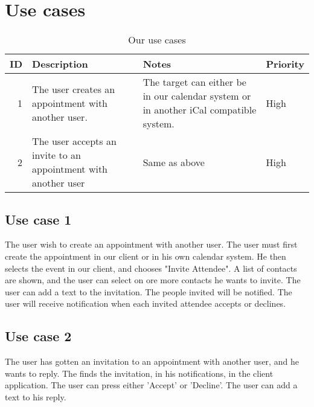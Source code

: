 \section{Use cases}
\begin{table*}[ht]\centering
  \begin{tabularx}{\textwidth}{@{}rXXl@{}}\toprule
    \textbf{ID} & \textbf{Description} & \textbf{Notes} & \textbf{Priority} \\\hline
    1 & The user creates an appointment with another user.             & The
    target can either be in our calendar system or in another iCal compatible
    system. & High \\\hline
    2 & The user accepts an invite to an appointment with another user & Same
    as above
    & High \\
    \bottomrule
  \end{tabularx}
  \caption{Our use cases}
  \label{usecases}\centering%
\end{table*}
\subsection{Use case 1}
The user wish to create an appointment with another user. The user must first create the appointment in our client or in his own calendar system. He then selects the event in our client, and chooses "Invite Attendee". A list of contacts are shown, and the user can select on ore more contacts he wants to invite. The user can add a text to the invitation. The people invited will be notified. The user will receive notification when each invited attendee accepts or declines.
\subsection{Use case 2}
The user has gotten an invitation to an appointment with another user, and he wants to reply.
The finds the invitation, in his notifications, in the client application. The user can press either 'Accept' or 'Decline'. The user can add a text to his reply.
\newpage
